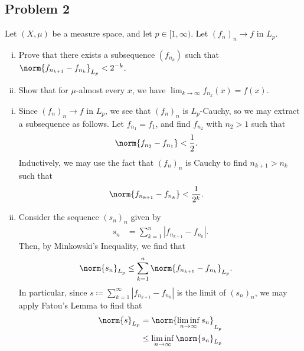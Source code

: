 \documentclass[10pt]{mypackage}
\begin{document}
\subsection{Problem 2}%
\begin{problem}
  Let $\left( X,\mu \right)$ be a measure space, and let $p\in [1,\infty)$. Let $\left( f_n \right)_n\rightarrow f$ in $L_{p}$.
  \begin{enumerate}[(i)]
    \item Prove that there exists a subsequence $\left( f_{n_k} \right)$ such that $\norm{f_{n_{k+1}} - f_{n_{k}}}_{L_p} < 2^{-k}$.
    \item Show that for $\mu$-almost every $x$, we have $\lim_{k\rightarrow\infty} f_{n_{k}}(x) = f(x)$.
  \end{enumerate}
\end{problem}
\begin{enumerate}[(i)]
  \item Since $\left( f_{n} \right)_{n}\rightarrow f$ in $L_{p}$, we see that $\left( f_{n} \right)_{n}$ is $L_{p}$-Cauchy, so we may extract a subsequence as follows. Let $f_{n_{1}} = f_{1}$, and find $f_{n_{2}}$ with $n_2 > 1$ such that
    \begin{align*}
      \norm{f_{n_2} - f_{n_1}} &< \frac{1}{2}.
    \end{align*}
    Inductively, we may use the fact that $\left( f_{n} \right)_n$ is Cauchy to find $n_{k+1} > n_{k}$ such that
    \begin{align*}
      \norm{f_{n_{k+1}} - f_{n_{k}}} &< \frac{1}{2^{k}}.
    \end{align*}
  \item Consider the sequence $\left( s_n \right)_n$ given by
    \begin{align*}
      s_n &= \sum_{k=1}^{n} \left\vert f_{n_{k+1}} - f_{n_{k}} \right\vert.
    \end{align*}
    Then, by Minkowski's Inequality, we find that
    \begin{align*}
      \norm{s_{n}}_{L_p} &\leq \sum_{k=1}^{n}\norm{f_{n_{k+1}} - f_{n_{k}}}_{L_p}.
    \end{align*}
    In particular, since $s\coloneq \sum_{k=1}^{\infty}\left\vert f_{n_{k+1}} - f_{n_{k}} \right\vert$ is the limit of $\left( s_n \right)_n$, we may apply Fatou's Lemma to find that
    \begin{align*}
      \norm{s}_{L_p} &= \norm{\liminf_{n\rightarrow\infty}s_n}_{L_p}\\
                     &\leq \liminf_{n\rightarrow\infty} \norm{s_n}_{L_p}\\

\end{align*}
\end{enumerate}
\end{document}
